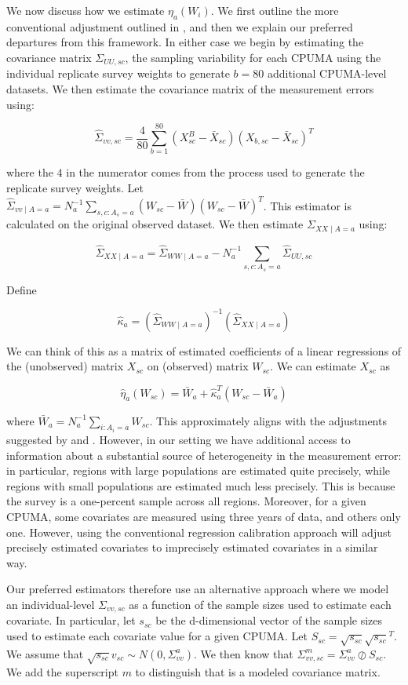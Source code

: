 \documentclass[12pt]{article}
\begin{document}
We now discuss how we estimate $\eta_a(W_i)$. We first outline the more conventional adjustment outlined in \cite{carroll2006measurement}, and then we explain our preferred departures from this framework. In either case we begin by estimating the covariance matrix $\Sigma_{UU, sc}$, the sampling variability for each CPUMA using the individual replicate survey weights to generate $b = 80$ additional CPUMA-level datasets. We then estimate the covariance matrix of the measurement errors using:

$$
\hat{\Sigma}_{vv, sc} = \frac{4}{80}\sum_{b=1}^{80}(X_{sc}^B - \bar{X}_{sc})(X_{b, sc} - \bar{X}_{sc})^T
$$

where the $4$ in the numerator comes from the process used to generate the replicate survey weights. Let $\hat{\Sigma}_{vv \mid A = a} = N_a^{-1}\sum_{s, c: A_s = a} (W_{sc} - \bar{W})(W_{sc} - \bar{W})^T$. This estimator is calculated on the original observed dataset. We then estimate $\Sigma_{XX \mid A = a}$ using:

$$
\hat{\Sigma}_{XX \mid A = a} = \hat{\Sigma}_{WW \mid A = a} - N_a^{-1}\sum_{s, c: A_s = a} \hat{\Sigma}_{UU, sc}
$$

Define

$$
\hat{\kappa}_a = (\hat{\Sigma}_{WW \mid A = a})^{-1}(\hat{\Sigma}_{XX \mid A = a})
$$

We can think of this as a matrix of estimated coefficients of a linear regressions of the (unobserved) matrix $X_{sc}$ on (observed) matrix $W_{sc}$. We can estimate $X_{sc}$ as

$$
\hat{\eta}_a(W_{sc}) = \bar{W}_a + \hat{\kappa}_a^T(W_{sc} - \bar{W}_a)
$$

where $\bar{W}_a = N_a^{-1}\sum_{i: A_i = a} W_{sc}$. This approximately aligns with the adjustments suggested by \cite{carroll2006measurement} and \cite{gleser1992importance}. However, in our setting we have additional access to information about a substantial source of heterogeneity in the measurement error: in particular, regions with large populations are estimated quite precisely, while regions with small populations are estimated much less precisely. This is because the survey is a one-percent sample across all regions. Moreover, for a given CPUMA, some covariates are measured using three years of data, and others only one. However, using the conventional regression calibration approach will adjust precisely estimated covariates to imprecisely estimated covariates in a similar way. 

Our preferred estimators therefore use an alternative approach where we model an individual-level $\Sigma_{vv, sc}$ as a function of the sample sizes used to estimate each covariate. In particular, let $s_{sc}$ be the d-dimensional vector of the sample sizes used to estimate each covariate value for a given CPUMA. Let $S_{sc} = \sqrt{s_{sc}}\sqrt{s_{sc}}^T$. We assume that $\sqrt{s_{sc}}v_{sc} \sim N(0, \Sigma_{vv}^a)$. We then know that $\Sigma_{vv, sc}^m = \Sigma_{vv}^a \oslash S_{sc}$. We add the superscript $m$ to distinguish that is a modeled covariance matrix.
\end{document}
